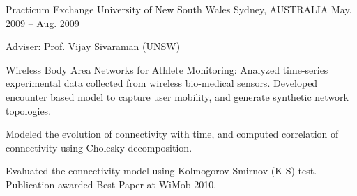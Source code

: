 \begin{cventries}
  \cventry
    {Practicum Exchange} %
    {University of New South Wales} %
    {Sydney, AUSTRALIA} %
    {May. 2009 -- Aug. 2009} %
    {
      \begin{cvitems} %
      \item {Adviser: Prof. Vijay Sivaraman (UNSW)}
%      
      \item {Wireless Body Area Networks for Athlete Monitoring: Analyzed time-series experimental data collected from wireless bio-medical sensors. Developed encounter based model to capture user mobility, and generate synthetic network topologies.
      		}
      \item {Modeled the evolution of connectivity with time, and computed correlation of connectivity using Cholesky decomposition.}
      \item {Evaluated the connectivity model using Kolmogorov-Smirnov (K-S) test. Publication awarded Best Paper at WiMob 2010.}
    \end{cvitems}
    }

%    
\end{cventries}

